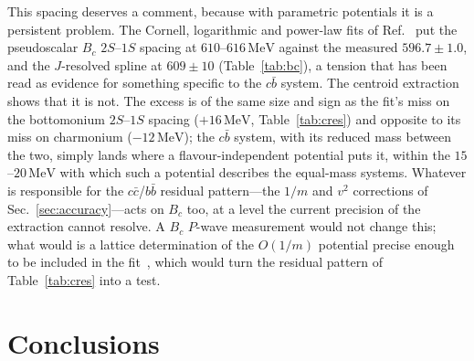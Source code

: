 \documentclass[10pt,twocolumn]{article}
\newcommand{\Bc}{B_c}
\newcommand{\cc}{c\bar c}
\newcommand{\bb}{b\bar b}
\newcommand{\cb}{c\bar b}
\newcommand{\MeV}{\,\mathrm{MeV}}
\begin{document}
This spacing deserves a comment, because with parametric potentials it is a persistent problem.
The Cornell, logarithmic and power-law fits of Ref.~\cite{Oppong2026} put the pseudoscalar $\Bc$ $2S$--$1S$ spacing at $610$--$616\MeV$ against the measured $596.7\pm1.0$, and the $J$-resolved spline at $609\pm10$ (Table~\ref{tab:bc}), a tension that has been read as evidence for something specific to the $\cb$ system.
The centroid extraction shows that it is not.
The excess is of the same size and sign as the fit's miss on the bottomonium $2S$--$1S$ spacing ($+16\MeV$, Table~\ref{tab:cres}) and opposite to its miss on charmonium ($-12\MeV$); the $\cb$ system, with its reduced mass between the two, simply lands where a flavour-independent potential puts it, within the $15$--$20\MeV$ with which such a potential describes the equal-mass systems.
Whatever is responsible for the $\cc$/$\bb$ residual pattern---the $1/m$ and $v^2$ corrections of Sec.~\ref{sec:accuracy}---acts on $\Bc$ too, at a level the current precision of the extraction cannot resolve.
A $\Bc$ $P$-wave measurement would not change this; what would is a lattice determination of the $O(1/m)$ potential precise enough to be included in the fit~\cite{Koma2006}, which would turn the residual pattern of Table~\ref{tab:cres} into a test.

\section{Conclusions}
\label{sec:conclusions}
\end{document}
